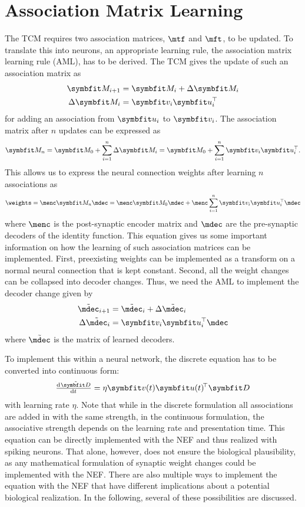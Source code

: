 \chapter{Association Matrix Learning}\label{sec:aml}

The TCM requires two association matrices, $\mtf$ and $\mft$, to be updated.
To translate this into neurons, an appropriate learning rule, the association matrix learning rule (AML), has to be derived.
The TCM gives the update of such an association matrix as
\begin{align}
    \mat M_{i+1} &= \mat M_i + \Delta \mat M_i \\
    \Delta \mat M_i &= \vc v_i \vc u_i\Tr
\end{align}
for adding an association from $\vc u_i$ to $\vc v_i$.
The association matrix after $n$ updates can be expressed as
\begin{equation}
    \mat M_n = \mat M_0 + \sum_{i=1}^{n} \Delta \mat M_i = \mat M_0 + \sum_{i=1}^n \vc v_i \vc u_i\Tr \text{.}
\end{equation}
This allows us to express the neural connection weights after learning $n$ associations as
\begin{equation}
    \weights = \menc \mat M_n \mdec = \menc \mat M_0 \mdec + \menc \sum_{i=1}^n \vc v_i \vc u_i\Tr \mdec
\end{equation}
where $\menc$ is the post-synaptic encoder matrix and $\mdec$ are the pre-synaptic decoders of the identity function.
This equation gives us some important information on how the learning of such association matrices can be implemented.
First, preexisting weights can be implemented as a transform on a normal neural connection that is kept constant.
Second, all the weight changes can be collapsed into decoder changes.
Thus, we need the AML to implement the decoder change given by
\begin{align}
    \tilde{\mdec}_{i+1} &= \tilde{\mdec}_i + \Delta \tilde{\mdec}_i \\
    \Delta \tilde{\mdec}_i &= \vc v_i \vc u_i\Tr \mdec
\end{align}
where $\tilde{\mdec}$ is the matrix of learned decoders.

To implement this within a neural network, the discrete equation has to be converted into continuous form:
\begin{equation}
    \od{\tilde{\mat D}}{t} = \eta \vc v(t) \vc u(t)\!\Tr \mat D \label{eqn:aml}
\end{equation}
with learning rate $\eta$.
Note that while in the discrete formulation all associations are added in with the same strength, in the continuous formulation, the associative strength depends on the learning rate and presentation time.
This equation can be directly implemented with the NEF and thus realized with spiking neurons.
That alone, however, does not ensure the biological plausibility, as any mathematical formulation of synaptic weight changes could be implemented with the NEF\@.
There are also multiple ways to implement the equation with the NEF that have different implications about a potential biological realization.
In the following, several of these possibilities are discussed.


